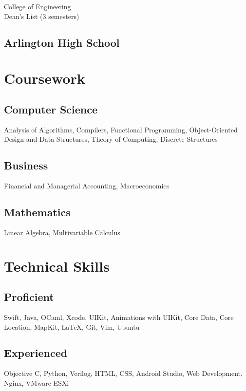 \documentclass[]{deedy-resume-openfont}
\let\sectionold\section
\renewcommand{\section}[1]{
	\sectionold{\textcolor{sectiontitlecolor}{#1}}
}
\begin{document}
\begin{minipage}[t]{0.33\textwidth}
College of Engineering \\
Dean's List (3 semesters) \\
\sectionsep

\subsection{Arlington High School}



\section{Coursework}
\subsection{Computer Science}
Analysis of Algorithms, Compilers, Functional Programming, Object-Oriented Design and Data Structures, Theory of Computing, Discrete Structures
\sectionsep

\subsection{Business}
Financial and Managerial Accounting, Macroeconomics
\sectionsep

\subsection{Mathematics}
Linear Algebra, Multivariable Calculus


\section{Technical Skills}
\subsection{Proficient}
Swift, Java, OCaml, Xcode, UIKit, Animations with UIKit, Core Data, Core Location, MapKit, \LaTeX{}, Git, Vim, Ubuntu
\sectionsep
\subsection{Experienced}
Objective C, Python, Verilog, HTML, CSS, Android Studio, Web Development, Nginx, VMware ESXi


\end{minipage}
\end{document}
